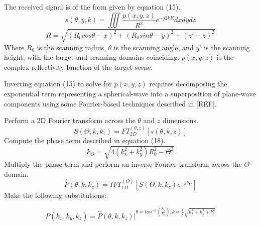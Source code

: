 \documentclass{IEEEtran}
\begin{document}
The received signal is of the form given by equation (15).
\begin{equation}
s(\theta,y,k) = \iiint \frac{p(x,y,z)}{R^2} e^{-j2kR}dxdydz
\end{equation}
\begin{equation}
R = \sqrt{(R_0 cos\theta-x)^2 + (R_0 sin\theta-y)^2 + (z' - z)^2}
\end{equation}
Where $R_0$ is the scanning radius, $\theta$ is the scanning angle, and $y'$ is the scanning height, with the target and scanning domains coinciding. $p(x,y,z)$ is the complex reflectivity function of the target scene.

Inverting equation (15) to solve for $p(x,y,z)$ requires decomposing the exponential term representing a spherical-wave into a superposition of plane-wave components using some Fourier-based techniques described in [REF].

Perform a 2D Fourier transform across the $\theta$ and $z$ dimensions.
\begin{equation}
S(\Theta,k,k_z) = FT^{(\theta,z)}_{2D}[s(\theta,k,z)]
\end{equation} 
Compute the phase term described in equation (18).
\begin{equation}
k_\Theta = \sqrt{4(k_x^2+k_y^2)R_0^2 - \Theta^2}
\end{equation}
Multiply the phase term and perform an inverse Fourier transform across the $\Theta$ domain.
\begin{equation}
\hat{P}(\theta,k,k_z) = IFT^{(\Theta)}_{1D} [S(\Theta,k,k_z)e^{-jk_\Theta}]
\end{equation}
Make the following substitutions:

\begin{equation}
P(k_x,k_y,k_z) = \hat{P}(\theta,k,k_z) \biggr\rvert^{\theta = tan^{-1}(\frac{k_y}{k_x}),k = \frac{1}{2} \sqrt{k_x^2+k_y^2+k_z^2}}
\end{equation}
\end{document}
